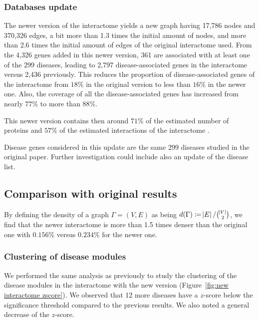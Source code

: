 \documentclass[letterpaper]{article}
\begin{document}
		\subsubsection{Databases update}
		The newer version of the interactome yields a new graph having 17,786 nodes and 370,326 edges, a bit more
		than 1.3 times the initial amount of nodes, and more than 2.6 times the initial amount of edges of the
		original interactome used. From the 4,326 genes added in this newer version, 361 are associated with at
		least one of the 299 diseases, leading to 2,797 disease-associated genes in the interactome versus 2,436
		previously. This reduces the proportion of disease-associated genes of the interactome from $18\%$ in
		the original version to less than $16\%$ in the newer one. Also, the coverage of all the disease-associated
		genes has increased from nearly $77\%$ to more than $88\%$.

		This newer version contains then around $71\%$ of the estimated number of proteins and $57\%$ of the
		estimated interactions of the interactome \citep{estimatingTheSizeOfTheHumanInteractome,ATruerMeasureOfOurIgnorance}.

		Disease genes considered in this update are the same 299 diseases studied in the original paper.
		Further investigation could include also an update of the disease list.

	\subsection{Comparison with original results}
	By defining the density of a graph $\Gamma = (V, E)$ as being $d(\Gamma) \coloneqq \abs E/\binom {\abs V}2$,
	we find that the newer interactome is more than 1.5 times denser than the original one with $0.156\%$ versus $0.234\%$
	for the newer one.

	\subsubsection{Clustering of disease modules}
	We performed the same analysis as previously to study the clustering of the disease modules in the
	interactome with the new version (Figure~\ref{fig:new interactome zscore}). We observed that 12 more
	diseases have a $z$-score below the significance threshold compared to the previous results. We also
	noted a general decrease of the $z$-score.
\end{document}
